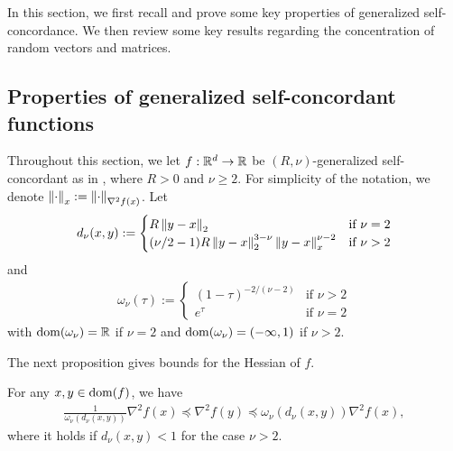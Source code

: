 In this section, we first recall and prove some key properties of generalized self-concordance.
We then review some key results regarding the concentration of random vectors and matrices.

\subsection{Properties of generalized self-concordant functions}
\label{sub:appendix:self_concordance}

Throughout this section, we let $f: {\mathbb R}^d \rightarrow {\mathbb R}$ be $(R, \nu)$-generalized self-concordant as in , where $R > 0$ and $\nu \ge 2$.
For simplicity of the notation, we denote $\left\lVert \cdot \right\rVert_x := \left\lVert \cdot \right\rVert_{\nabla^2 f(x)}$.
Let
\begin{align}\label{eq:d_nu}
    d_\nu(x, y) :=
    \begin{cases}
        R \left\lVert y - x \right\rVert_2 & \mbox{if } \nu = 2 \\
        (\nu/2 - 1) R \left\lVert y - x \right\rVert_2^{3-\nu} \left\lVert y - x \right\rVert_x^{\nu-2} & \mbox{if } \nu > 2
    \end{cases}
\end{align}
and
\begin{align}\label{eq:omega_nu}
    \omega_\nu(\tau) :=
    \begin{cases}
        (1 - \tau)^{-2/(\nu-2)} & \mbox{if } \nu > 2 \\
        e^{\tau} & \mbox{if } \nu = 2
    \end{cases}
\end{align}
with $\operatorname{dom}(\omega_\nu) = {\mathbb R}$ if $\nu = 2$ and $\operatorname{dom}(\omega_\nu) = (-\infty, 1)$ if $\nu > 2$.

The next proposition gives bounds for the Hessian of $f$.
\begin{proposition}
\label{prop:hessian}
    For any $x, y \in \operatorname{dom}(f)$, we have
    \begin{align*}
        \frac{1}{\omega_\nu(d_\nu(x, y))} \nabla^2 f(x) \preceq \nabla^2 f(y) \preceq \omega_\nu(d_\nu(x,y)) \nabla^2 f(x),
    \end{align*}
    where it holds if $d_\nu(x, y) < 1$ for the case $\nu > 2$.
\end{proposition}

